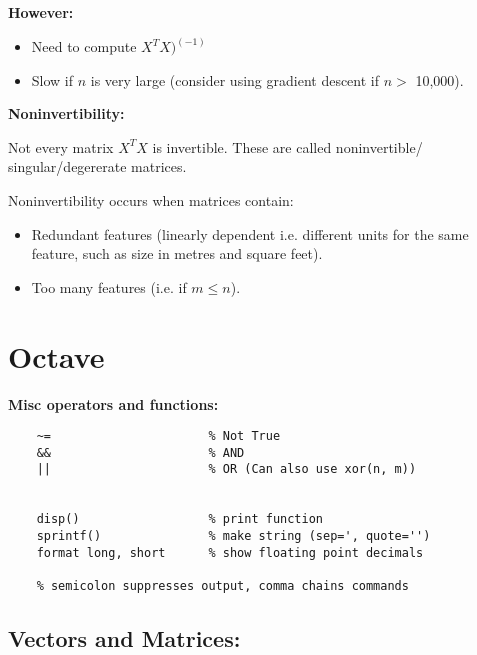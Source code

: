 \documentclass[12pt, a4paper]{article}
\begin{document}
  \newpage

  \textbf{However:}
  \begin{itemize}
    \item Need to compute $X^TX)^{(-1)}$
    \item Slow if $n$ is very large (consider using gradient descent if
      $n >$ 10,000).
  \end{itemize}

  \textbf{Noninvertibility:}

  Not every matrix $X^TX$ is invertible. These are called noninvertible/\\
  singular/degererate matrices.

  Noninvertibility occurs when matrices contain:
  \begin{itemize}
    \item Redundant features (linearly dependent i.e. different units for 
          the same feature, such as size in metres and square feet).
    \item Too many features (i.e. if $m \leq n$).
  \end{itemize}

  \newpage

\section{Octave}

  \textbf{Misc operators and functions:}
  \begin{lstlisting}
    ~=                      % Not True
    &&                      % AND
    ||                      % OR (Can also use xor(n, m))
 

    disp()                  % print function
    sprintf()               % make string (sep=', quote='')
    format long, short      % show floating point decimals

    % semicolon suppresses output, comma chains commands

  \end{lstlisting}

  \subsection{Vectors and Matrices:}
\end{document}
